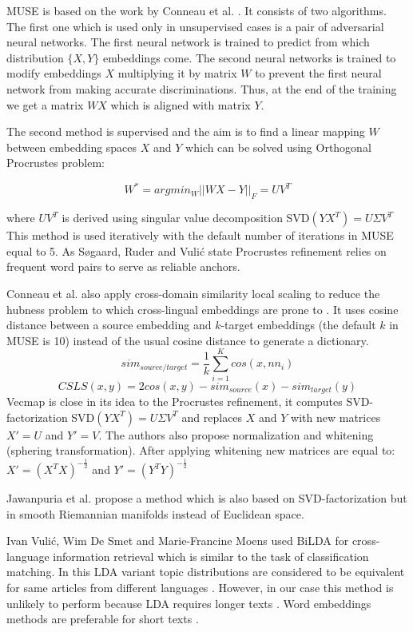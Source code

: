 \documentclass[11pt,a4paper]{article}
\begin{document}
MUSE is based on the work by Conneau et al. \cite{muse}. It consists of two algorithms. The first one which is used only in unsupervised cases is a pair of adversarial neural networks. The first neural network is trained to predict from which distribution $\{X, Y\}$ embeddings come. The second neural networks is trained to modify embeddings $X$ multiplying it by matrix $W$ to prevent the first neural network from making accurate discriminations. Thus, at the end of the training we get a matrix $WX$ which is aligned with matrix $Y$.

The second method is supervised and the aim is to find a linear mapping $W$ between embedding spaces $X$ and $Y$ which can be solved using Orthogonal Procrustes problem:

$$ W^* = argmin_W ||WX - Y||_F = UV^T$$

where $UV^T$ is derived using singular value decomposition SVD$(YX^T) = U \Sigma V^T$
This method is used iteratively with the default number of iterations in MUSE equal to 5. As Søgaard, Ruder and Vulić state Procrustes refinement relies on frequent word pairs to serve as reliable anchors.

Conneau et al. also apply cross-domain similarity local scaling to reduce the hubness problem to which cross-lingual embeddings are prone to \cite{dinu}. It uses cosine distance between a source embedding and $k$-target embeddings (the default $k$ in MUSE is 10) instead of the usual cosine distance to generate a dictionary.
$$sim_{source/target} = \dfrac{1}{k}\sum_{i=1}^Kcos(x, nn_i)$$
\small
$$CSLS(x,y) = 2cos(x,y) - sim_{source}(x)  - sim_{target}(y)$$
\normalsize
Vecmap \cite{vecmap} is close in its idea to the Procrustes refinement, it computes SVD-factorization SVD$(YX^T) = U\Sigma V^T$ and replaces $X$ and $Y$ with new matrices $X' = U$ and $Y' = V$. The authors also propose normalization and whitening (sphering transformation). After applying whitening new matrices are equal to:
$X' = (X^TX)^{-\tfrac{1}{2}}$ and $Y' = (Y^TY)^{-\tfrac{1}{2}}$

Jawanpuria et al. \cite{jawanpuria} propose a method which is also based on SVD-factorization but in smooth Riemannian manifolds instead of Euclidean space.

Ivan Vulić, Wim De Smet and Marie-Francine Moens  used BiLDA for cross-language information retrieval which is similar to the task of classification matching. In this LDA variant topic distributions are considered to be equivalent for same articles from different languages \cite{bilda}. However, in our case this method is unlikely to perform because LDA requires longer texts \cite{short-lda}. Word embeddings methods are preferable for short texts \cite{maslova-potapov}.
\end{document}

